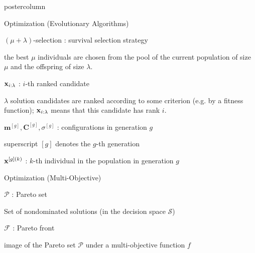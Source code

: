 \documentclass{beamer}
\begin{document}
\begin{frame}[fragile]{}
\begin{columns}
\begin{column}{.31\textwidth}
\begin{beamercolorbox}[center]{postercolumn}
\begin{minipage}{.98\textwidth}
{\begin{myblock}{Optimization (Evolutionary Algorithms)}
						\begin{codebox}
							 $(\mu + \lambda)$-selection : survival selection strategy
						\end{codebox}
						\hspace*{1ex} the best $\mu$ individuals are chosen from the pool of the current population of size $\mu$ and the offspring of size $\lambda$. \\
						\begin{codebox}
							 $\mathbf{x}_{i:\lambda}$ : $i$-th ranked candidate
						\end{codebox}
						\hspace*{1ex} $\lambda$ solution candidates are ranked according to some criterion (e.g. by a fitness function); $\mathbf{x}_{i:\lambda}$ means that this candidate has rank $i$. \\
						\begin{codebox}
							 $\bm{m}^{[g]}, \bm{C}^{[g]}, \sigma^{[g]}$ : configurations in generation $g$
						\end{codebox}
						\hspace*{1ex} superscript $[g]$ denotes the $g$-th generation \\
						\begin{codebox}
							 $\mathbf{x}^{[g](k)}$ : $k$-th individual in the population in generation $g$
						\end{codebox}
						\end{myblock}
						\begin{myblock}{Optimization (Multi-Objective)}
						\begin{codebox}
							 $\mathcal{P}$ : Pareto set
						\end{codebox}
						\hspace*{1ex} Set of nondominated solutions (in the decision space $\mathcal{S}$) \\
						\begin{codebox}
							 $\mathcal{F}$ : Pareto front
						\end{codebox}
						\hspace*{1ex} image of the Pareto set $\mathcal{P}$ under a multi-objective function $f$ \\
					\end{myblock}

				}
			\end{minipage}
		\end{beamercolorbox}
	\end{column}
\end{columns}
\end{frame}
\end{document}
